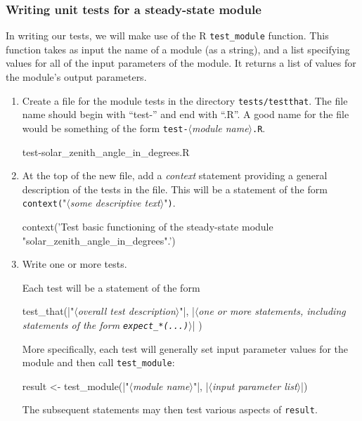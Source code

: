 \documentclass{article}\usepackage[]{graphicx}\usepackage[]{color}
\newcommand{\code}[1]{\lstinline[style=C++style]{#1}}
\newcommand{\Rcode}[1]{\lstinline[style=Rstyle]{#1}}
\newcommand{\placeholder}[1]{$\langle$\textrm{\textit{#1}}$\rangle$}
\newcommand{\stringplaceholder}[1]{{\color{stringcolor}"$\langle$\textrm{\textit{#1}}$\rangle$"}}
\begin{document}
\subsubsection{Writing unit tests for a steady-state module}
\label{sec:write_ss_unit_test}

  In writing our tests, we will make use of the R \Rcode{test_module}
  function.  This function takes as input the name of a module (as a
  string), and a list specifying values for all of the input
  parameters of the module.  It returns a list of values for the
  module's output parameters.

\begin{enumerate}

\item Create a file for the module tests in the directory
  \code{tests/testthat}.  The file name should begin with ``test-'' and
  end with ``.R''.  A good name for the file would be something of the
  form \code{test-}\placeholder{module name}\code{.R}.

  \begin{example}[4]
    test-solar_zenith_angle_in_degrees.R
  \end{example}

\item At the top of the new file, add a \emph{context} statement
  providing a general description of the tests in the file.  This
  will be a statement of the form
  \Rcode{context(}\stringplaceholder{some descriptive text}\Rcode{)}.

  \begin{Rexample}[4]
    context('Test basic functioning of the steady-state module "solar_zenith_angle_in_degrees".')
  \end{Rexample}

\item Write one or more tests.

  Each test will be a statement of the form
  \begin{Rlisting}[4]
    test_that(|\stringplaceholder{overall test description}|, {
      |\placeholder{one or more statements, including statements of the form \texttt{expect\_*(...)}}|
    })
  \end{Rlisting}

  More specifically, each test will generally set input parameter
  values for the module and then call
  \Rcode{test_module}:
  \begin{Rlisting}[4]
    result <- test_module(|\stringplaceholder{module name}|, |\placeholder{input parameter list}|)
  \end{Rlisting}
  The subsequent statements may then test various aspects of \Rcode{result}.


\end{enumerate}
\end{document}
